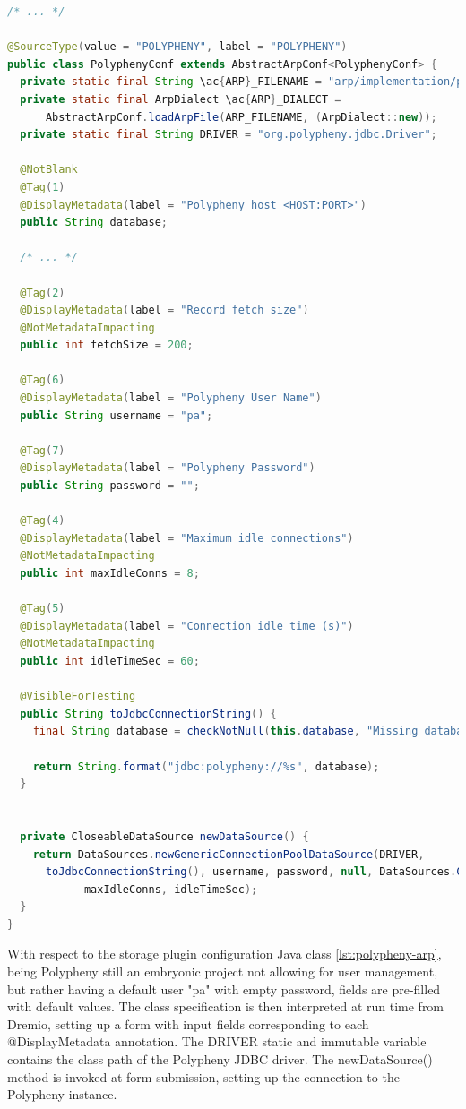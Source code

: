 \begin{lstlisting}[language=JAVA, caption={The storage plugin configuration file}, label={lst:polypheny-arp}]
/* ... */

@SourceType(value = "POLYPHENY", label = "POLYPHENY")
public class PolyphenyConf extends AbstractArpConf<PolyphenyConf> {
  private static final String \ac{ARP}_FILENAME = "arp/implementation/polypheny-arp.yaml";
  private static final ArpDialect \ac{ARP}_DIALECT =
      AbstractArpConf.loadArpFile(ARP_FILENAME, (ArpDialect::new));
  private static final String DRIVER = "org.polypheny.jdbc.Driver";

  @NotBlank
  @Tag(1)
  @DisplayMetadata(label = "Polypheny host <HOST:PORT>")
  public String database;

  /* ... */

  @Tag(2)
  @DisplayMetadata(label = "Record fetch size")
  @NotMetadataImpacting
  public int fetchSize = 200;

  @Tag(6)
  @DisplayMetadata(label = "Polypheny User Name")
  public String username = "pa";

  @Tag(7)
  @DisplayMetadata(label = "Polypheny Password")
  public String password = "";

  @Tag(4)
  @DisplayMetadata(label = "Maximum idle connections")
  @NotMetadataImpacting
  public int maxIdleConns = 8;

  @Tag(5)
  @DisplayMetadata(label = "Connection idle time (s)")
  @NotMetadataImpacting
  public int idleTimeSec = 60;

  @VisibleForTesting
  public String toJdbcConnectionString() {
    final String database = checkNotNull(this.database, "Missing database.");

    return String.format("jdbc:polypheny://%s", database);
  }


  private CloseableDataSource newDataSource() {
    return DataSources.newGenericConnectionPoolDataSource(DRIVER,
      toJdbcConnectionString(), username, password, null, DataSources.CommitMode.DRIVER_SPECIFIED_COMMIT_MODE,
            maxIdleConns, idleTimeSec);
  }
}
\end{lstlisting}

With respect to the storage plugin configuration Java class \ref{lst:polypheny-arp}, being Polypheny still an embryonic project not allowing for user management, but rather having a default user "pa" with empty password, fields are pre-filled with default values. The class specification is then interpreted at run time from Dremio, setting up a form with input fields corresponding to each @DisplayMetadata annotation.
The DRIVER static and immutable variable contains the class path of the Polypheny \ac{JDBC} driver. The newDataSource() method is invoked at form submission, setting up the connection to the Polypheny instance.

